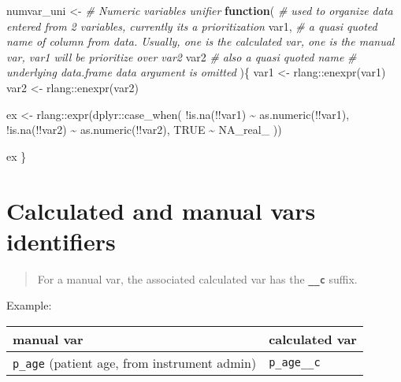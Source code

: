 \documentclass[
]{book}
\newenvironment{Shaded}{\begin{snugshade}}{\end{snugshade}}
\newcommand{\CommentTok}[1]{\textcolor[rgb]{0.56,0.35,0.01}{\textit{#1}}}
\newcommand{\ConstantTok}[1]{\textcolor[rgb]{0.00,0.00,0.00}{#1}}
\newcommand{\ControlFlowTok}[1]{\textcolor[rgb]{0.13,0.29,0.53}{\textbf{#1}}}
\newcommand{\FunctionTok}[1]{\textcolor[rgb]{0.00,0.00,0.00}{#1}}
\newcommand{\NormalTok}[1]{#1}
\newcommand{\OtherTok}[1]{\textcolor[rgb]{0.56,0.35,0.01}{#1}}
\newcommand{\SpecialCharTok}[1]{\textcolor[rgb]{0.00,0.00,0.00}{#1}}
\begin{document}
\begin{Shaded}
\begin{Highlighting}[]
\NormalTok{numvar\_uni }\OtherTok{\textless{}{-}} \CommentTok{\# Numeric variables unifier}
  \ControlFlowTok{function}\NormalTok{( }\CommentTok{\# used to organize data entered from 2 variables, currently its a prioritization}
\NormalTok{    var1, }\CommentTok{\# a quasi quoted name of column from data. Usually, one is the calculated var, one is the manual var, var1 will be prioritize over var2}
\NormalTok{    var2 }\CommentTok{\# also a quasi quoted name}
    \CommentTok{\# underlying data.frame data argument is omitted}
\NormalTok{  )\{}
\NormalTok{    var1 }\OtherTok{\textless{}{-}}\NormalTok{ rlang}\SpecialCharTok{::}\FunctionTok{enexpr}\NormalTok{(var1)}
\NormalTok{    var2 }\OtherTok{\textless{}{-}}\NormalTok{ rlang}\SpecialCharTok{::}\FunctionTok{enexpr}\NormalTok{(var2)}
    
\NormalTok{    ex }\OtherTok{\textless{}{-}}\NormalTok{ rlang}\SpecialCharTok{::}\FunctionTok{expr}\NormalTok{(dplyr}\SpecialCharTok{::}\FunctionTok{case\_when}\NormalTok{(}
      \SpecialCharTok{!}\FunctionTok{is.na}\NormalTok{(}\SpecialCharTok{!!}\NormalTok{var1) }\SpecialCharTok{\textasciitilde{}} \FunctionTok{as.numeric}\NormalTok{(}\SpecialCharTok{!!}\NormalTok{var1),}
      \SpecialCharTok{!}\FunctionTok{is.na}\NormalTok{(}\SpecialCharTok{!!}\NormalTok{var2) }\SpecialCharTok{\textasciitilde{}} \FunctionTok{as.numeric}\NormalTok{(}\SpecialCharTok{!!}\NormalTok{var2),}
      \ConstantTok{TRUE} \SpecialCharTok{\textasciitilde{}} \ConstantTok{NA\_real\_}
\NormalTok{    ))}
    
\NormalTok{    ex}
\NormalTok{  \}}
\end{Highlighting}
\end{Shaded}

\hypertarget{calculated-and-manual-vars-identifiers}{%
\section{Calculated and manual vars identifiers}\label{calculated-and-manual-vars-identifiers}}

\begin{quote}
For a manual var, the associated calculated var has the \textbf{\texttt{\_\_c}}
suffix.
\end{quote}

Example:

\begin{longtable}[]{@{}ll@{}}
\toprule()
manual var & calculated var \\
\midrule()
\endhead
\texttt{p\_age} (patient age, from instrument admin) & \texttt{p\_age\_\_c} \\
\bottomrule()
\end{longtable}
\end{document}
